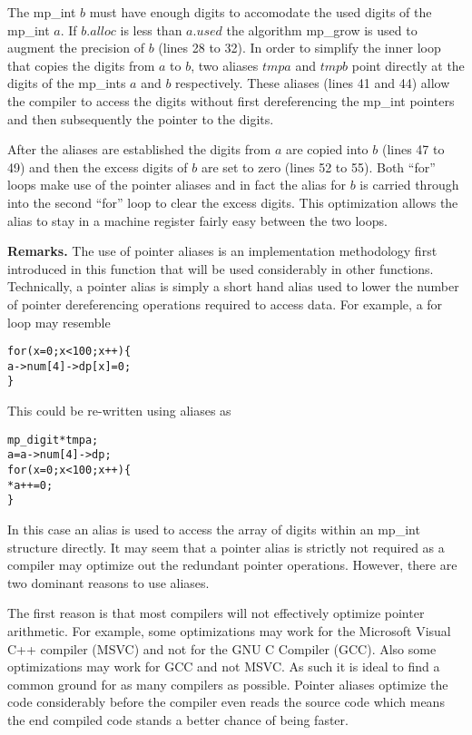 \documentclass[b5paper]{book}
\begin{document}
The mp\_int $b$ must have enough digits to accomodate the used digits of the mp\_int $a$.  If $b.alloc$ is less than
$a.used$ the algorithm mp\_grow is used to augment the precision of $b$ (lines 28 to 32).  In order to
simplify the inner loop that copies the digits from $a$ to $b$, two aliases $tmpa$ and $tmpb$ point directly at the digits
of the mp\_ints $a$ and $b$ respectively.  These aliases (lines 41 and 44) allow the compiler to access the digits without first dereferencing the
mp\_int pointers and then subsequently the pointer to the digits.  

After the aliases are established the digits from $a$ are copied into $b$ (lines 47 to 49) and then the excess 
digits of $b$ are set to zero (lines 52 to 55).  Both ``for'' loops make use of the pointer aliases and in 
fact the alias for $b$ is carried through into the second ``for'' loop to clear the excess digits.  This optimization 
allows the alias to stay in a machine register fairly easy between the two loops.

\textbf{Remarks.}  The use of pointer aliases is an implementation methodology first introduced in this function that will
be used considerably in other functions.  Technically, a pointer alias is simply a short hand alias used to lower the 
number of pointer dereferencing operations required to access data.  For example, a for loop may resemble

\begin{alltt}
for (x = 0; x < 100; x++) \{
    a->num[4]->dp[x] = 0;
\}
\end{alltt}

This could be re-written using aliases as 

\begin{alltt}
mp_digit *tmpa;
a = a->num[4]->dp;
for (x = 0; x < 100; x++) \{
    *a++ = 0;
\}
\end{alltt}

In this case an alias is used to access the 
array of digits within an mp\_int structure directly.  It may seem that a pointer alias is strictly not required 
as a compiler may optimize out the redundant pointer operations.  However, there are two dominant reasons to use aliases.

The first reason is that most compilers will not effectively optimize pointer arithmetic.  For example, some optimizations 
may work for the Microsoft Visual C++ compiler (MSVC) and not for the GNU C Compiler (GCC).  Also some optimizations may 
work for GCC and not MSVC.  As such it is ideal to find a common ground for as many compilers as possible.  Pointer 
aliases optimize the code considerably before the compiler even reads the source code which means the end compiled code 
stands a better chance of being faster.
\end{document}
